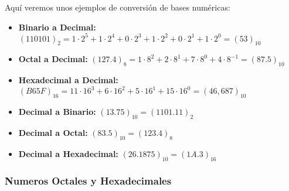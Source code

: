 \newpage

Aquí veremos unos ejemplos de conversión de bases numéricas:

\begin{itemize}
    \item \textbf{Binario a Decimal:} $(110101)_2 = 1 \cdot 2^5 + 1 \cdot 2^4 + 0 \cdot 2^3 + 1 \cdot 2^2 + 0 \cdot 2^1 + 1 \cdot 2^0 = (53)_{10}$
    \item \textbf{Octal a Decimal:} $(127.4)_8 = 1 \cdot 8^2 + 2 \cdot 8^1 + 7 \cdot 8^0 + 4 \cdot 8^{-1} = (87.5)_{10}$
    \item \textbf{Hexadecimal a Decimal:} $(B65F)_{16} = 11 \cdot 16^3 + 6 \cdot 16^2 + 5 \cdot 16^1 + 15 \cdot 16^0 = (46,687)_{10}$
    \item \textbf{Decimal a Binario:} $(13.75)_{10} = (1101.11)_2$
    \item \textbf{Decimal a Octal:} $(83.5)_{10} = (123.4)_8$
    \item \textbf{Decimal a Hexadecimal:} $(26.1875)_{10} = (1A.3)_{16}$
\end{itemize}

\subsubsection{Numeros Octales y Hexadecimales}


